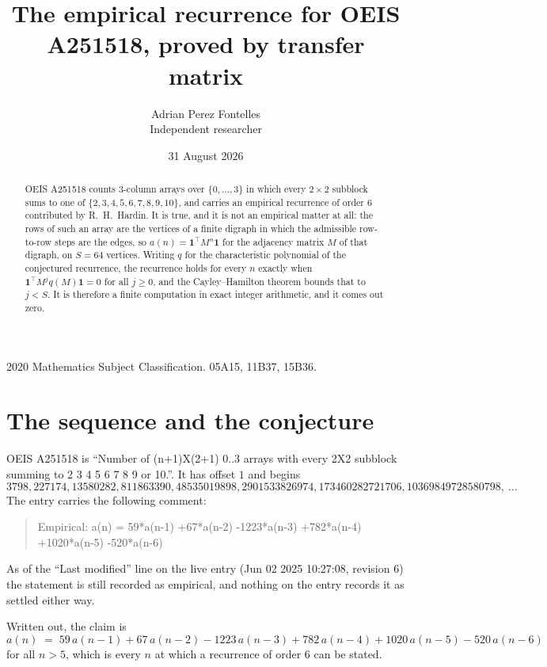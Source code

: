 \documentclass[11pt,a4paper]{article}
\title{The empirical recurrence for OEIS A251518, proved by transfer matrix}
\author{Adrian Perez Fontelles\\ \small Independent researcher}
\date{31 August 2026}
\theoremstyle{plain}
\theoremstyle{definition}
\begin{document}
\maketitle

\begin{abstract}
OEIS A251518 counts $3$-column arrays over $\{0,\dots,3\}$ in which every
$2\times2$ subblock sums to one of $\{2, 3, 4, 5, 6, 7, 8, 9, 10\}$, and carries an empirical
recurrence of order $6$ contributed by R.~H.~Hardin. It is true, and it is not an
empirical matter at all: the rows of such an array are the vertices of a finite digraph in
which the admissible row-to-row steps are the edges, so $a(n)=\mathbf{1}^{\!\top}M^{n}
\mathbf{1}$ for the adjacency matrix $M$ of that digraph, on $S=64$ vertices. Writing
$q$ for the characteristic polynomial of the conjectured recurrence, the recurrence holds
for every $n$ exactly when $\mathbf{1}^{\!\top}M^{j}q(M)\mathbf{1}=0$ for all
$j\ge0$, and the Cayley--Hamilton theorem bounds that to $j<S$. It is therefore a finite
computation in exact integer arithmetic, and it comes out zero.
\end{abstract}

\noindent\small 2020 Mathematics Subject Classification. 05A15, 11B37, 15B36.\normalsize

\section{The sequence and the conjecture}

OEIS A251518 is ``Number of (n+1)X(2+1) 0..3 arrays with every 2X2 subblock summing to 2 3 4 5 6 7 8 9 or 10.''. It has offset $1$
and begins
\[
3798, 227174, 13580282, 811863390, 48535019898, 2901533826974, 173460282721706, 10369849728580798,\ \dots
\]
The entry carries the following comment:
\begin{quote}\small
Empirical: a(n) = 59*a(n-1) +67*a(n-2) -1223*a(n-3) +782*a(n-4) +1020*a(n-5) -520*a(n-6)
\end{quote}
As of the ``Last modified'' line on the live entry (Jun 02 2025 10:27:08, revision 6) the statement is
still recorded as empirical, and nothing on the entry records it as settled either way.

Written out, the claim is
\begin{equation}\label{eq:conj}
a(n)\;=\;59\,a(n-1) + 67\,a(n-2) - 1223\,a(n-3) + 782\,a(n-4) + 1020\,a(n-5) - 520\,a(n-6)
\end{equation}
for all $n>5$, which is every $n$ at which a recurrence of order $6$ can be
stated.
\end{document}
